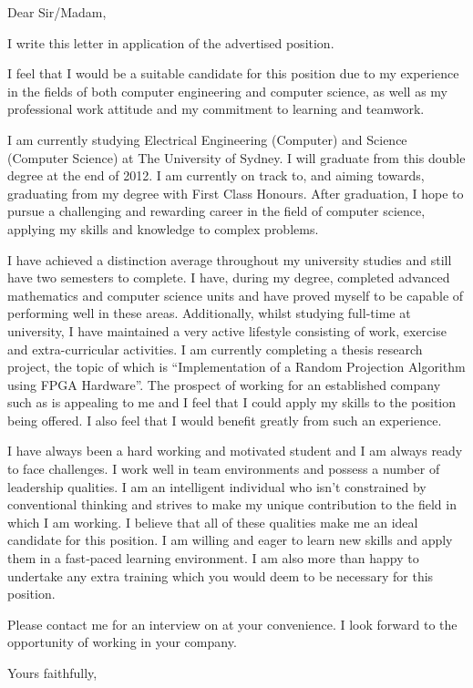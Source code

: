 \documentclass{letter}
\newcommand{\company}{}
\newcommand{\toAddress}{}
\begin{document}
 
\begin{letter}{\toAddress}

\opening{Dear Sir/Madam,}

I write this letter in application of the advertised position.

I feel that I would be a suitable candidate for this position due to my 
experience in the fields of both computer engineering and computer science, as 
well as my professional work attitude and my commitment to learning and 
teamwork.

I am currently studying Electrical Engineering (Computer) and Science (Computer 
Science) at The University of Sydney. I will graduate from this double degree at
the end of 2012. I am currently on track to, and aiming towards, graduating from
my degree with First Class Honours. After graduation, I hope to pursue a 
challenging and rewarding career in the field of computer science, applying my 
skills and knowledge to complex problems.

I have achieved a distinction average throughout my university studies and still
have two semesters to complete. I have, during my degree, completed advanced 
mathematics and computer science units and have proved myself to be capable of 
performing well in these areas. Additionally, whilst studying full-time at 
university, I have maintained a very active lifestyle consisting of work, 
exercise and extra-curricular activities. I am currently completing a thesis 
research project, the topic of which is ``Implementation of a Random Projection 
Algorithm using FPGA Hardware''. The prospect of working for an established 
company such as \company is appealing to me and I feel that I could apply my 
skills to the position being offered. I also feel that I would benefit greatly 
from such an experience.

I have always been a hard working and motivated student and I am always ready to
face challenges. I work well in team environments and possess a number of 
leadership qualities. I am an intelligent individual who isn’t constrained by 
conventional thinking and strives to make my unique contribution to the field in
which I am working. I believe that all of these qualities make me an ideal
candidate for this position. I am willing and eager to learn new skills and 
apply them in a fast‐paced learning environment. I am also more than happy to 
undertake any extra training which you would deem to be necessary for this 
position.

Please contact me for an interview on \myMobile at your convenience. I look 
forward to the opportunity of working in your company.

\closing{Yours faithfully,}

\end{letter}
\end{document}
